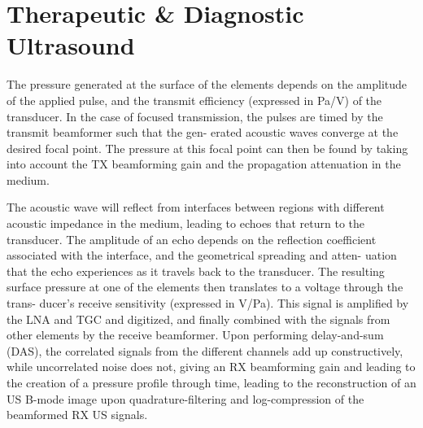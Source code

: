 \section{Therapeutic \& Diagnostic Ultrasound}
\label{sec:ultrasound_imaging}

The pressure generated at the surface of the elements depends on the 
amplitude of the applied pulse, and the transmit efficiency (expressed in Pa/V) 
of the transducer. In the case of focused transmission, the pulses are timed by 
the transmit beamformer such that the gen- erated acoustic waves converge at the 
desired focal point. The pressure at this focal point can then be found by taking 
into account the TX beamforming gain and the propagation attenuation in the medium. 

The acoustic wave will reflect from interfaces between regions with different 
acoustic impedance in the medium, leading to echoes that return to the transducer. 
The amplitude of an echo depends on the reflection coefficient associated with the 
interface, and the geometrical spreading and atten- uation that the echo experiences 
as it travels back to the transducer. The resulting surface pressure at one of the 
elements then translates to a voltage through the trans- ducer’s receive sensitivity 
(expressed in V/Pa). This signal is amplified by the LNA and TGC and digitized, and 
finally combined with the signals from other elements by the receive beamformer. 
Upon performing delay-and-sum (DAS), the correlated signals from the different channels 
add up constructively, while uncorrelated noise does not, giving an RX beamforming gain 
and leading to the creation of a pressure profile through time, leading to the reconstruction 
of an US B-mode image upon quadrature-filtering and log-compression of the beamformed RX US 
signals.



